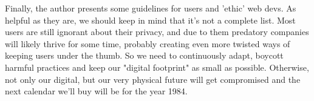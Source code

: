 \documentclass[12pt]{article}
\begin{document}
Finally, the author presents some guidelines for users and 'ethic' web devs. As helpful as they are, we should keep in mind that it's not a complete list. Most users are still ignorant about their privacy, and due to them predatory companies will likely thrive for some time, probably creating even more twisted ways of keeping users under the thumb. So we need to continuously adapt, boycott harmful practices and keep our "digital footprint" as small as possible. Otherwise, not only our digital, but our very physical future will get compromised and the next calendar we'll buy will be for the year 1984.
\end{document}
